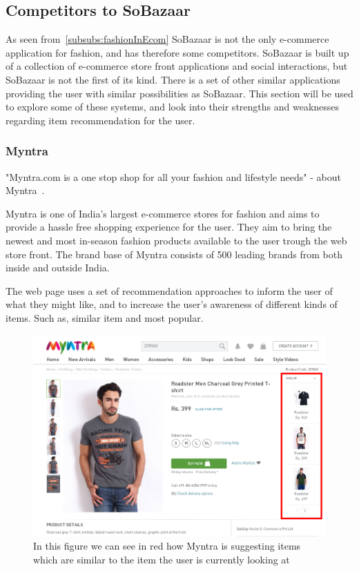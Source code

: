 \subsection{Competitors to SoBazaar}


    As seen from~\ref{subsubs:fashionInEcom} SoBazaar is not the only e-commerce application for fashion, and has therefore some competitors.
    SoBazaar is built up of a collection of e-commerce store front applications and social interactions, but SoBazaar is not the first of its kind.
    There is a set of other similar applications providing the user with similar possibilities as SoBazaar.
    This section will be used to explore some of these systems, and look into their strengths and weaknesses regarding item recommendation for the user.

\subsubsection{Myntra} %
\label{par:myntra}
    "Myntra.com is a one stop shop for all your fashion and lifestyle needs" - about Myntra~\cite{myntra}.

    Myntra is one of India's largest e-commerce stores for fashion and aims to  provide a hassle free shopping experience for the user.
    They aim to bring the newest and most in-season fashion products available to the user trough the web store front.
    The brand base of Myntra consists of 500 leading brands from both inside and outside India.

    The web page uses a set of recommendation approaches to inform the user of what they might like, and to increase the user's awareness of different kinds of items. Such as, similar item and most popular.

    \begin{figure}[H]
        \centering
        \includegraphics[width=5in]{image/myntiaSimilarExample.png}
        \caption[Example of Myntra's "similar item" approach]{In this figure we can see in red how Myntra is suggesting items which are similar to the item the user is currently looking at}
        \label{figure:myntiaSimilarEx}
    \end{figure}

